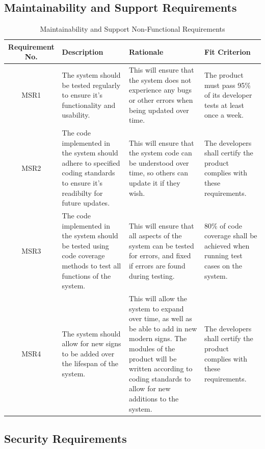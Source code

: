 \documentclass[12pt, titlepage]{article}
\begin{document}
\subsection{Maintainability and Support Requirements}

\begin{longtable}{| c | p{3cm}| p{3cm}| p{3cm}|}
\caption{Maintainability and Support Non-Functional Requirements} \\
\hline 
\textbf{Requirement No.} & \textbf{Description} & \textbf{Rationale} & \textbf{Fit Criterion}\\
\hline
MSR1 & The system should be tested regularly to ensure it's functionality and usability. & This will ensure that the system does not experience any bugs or other errors when being updated over time. & The product must pass 95\% of its developer tests at least once a week. \\
\hline
MSR2 & The code implemented in the system should adhere to specified coding standards to ensure it's readibilty for future updates. & This will ensure that the system code can be understood over time, so others can update it if they wish. & The developers shall certify the product complies with these requirements. \\
\hline
MSR3 & The code implemented in the system should be tested using code coverage methods to test all functions of the system. & This will ensure that all aspects of the system can be tested for errors, and fixed if errors are found during testing. & 80\% of code coverage shall be achieved when running test cases on the system. \\
\hline
MSR4 & The system should allow for new signs to be added over the lifespan of the system. & This will allow the system to expand over time, as well as be able to add in new modern signs. The modules of the product will be written according to coding standards to allow for new additions to the system. & The developers shall certify the product complies with these requirements. \\
\bottomrule
\end{longtable}

\subsection{Security Requirements}
\end{document}
